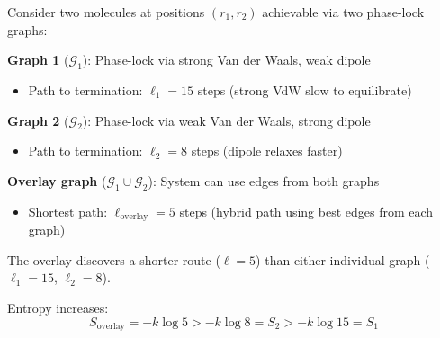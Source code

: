 \documentclass[12pt,a4paper]{article}
\theoremstyle{remark}
\begin{document}
\begin{example}
Consider two molecules at positions $(r_1, r_2)$ achievable via two phase-lock graphs:

\textbf{Graph 1} ($\mathcal{G}_1$): Phase-lock via strong Van der Waals, weak dipole
\begin{itemize}
\item Path to termination: $\ell_1 = 15$ steps (strong VdW slow to equilibrate)
\end{itemize}

\textbf{Graph 2} ($\mathcal{G}_2$): Phase-lock via weak Van der Waals, strong dipole  
\begin{itemize}
\item Path to termination: $\ell_2 = 8$ steps (dipole relaxes faster)
\end{itemize}

\textbf{Overlay graph} ($\mathcal{G}_1 \cup \mathcal{G}_2$): System can use edges from both graphs
\begin{itemize}
\item Shortest path: $\ell_{\text{overlay}} = 5$ steps (hybrid path using best edges from each graph)
\end{itemize}

The overlay discovers a shorter route ($\ell = 5$) than either individual graph ($\ell_1 = 15$, $\ell_2 = 8$).

Entropy increases:
\begin{equation}
S_{\text{overlay}} = -k \log 5 > -k \log 8 = S_2 > -k \log 15 = S_1
\end{equation}
\end{example}
\end{document}

